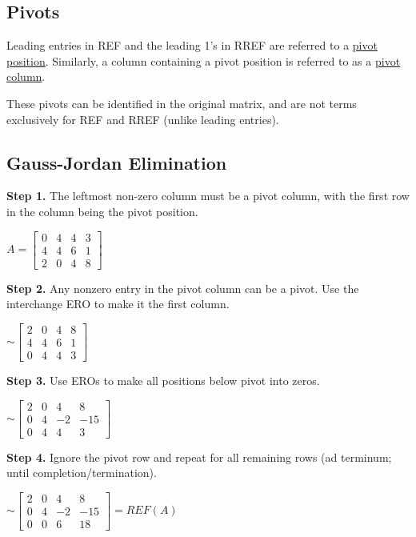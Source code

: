 \documentclass{report}
\begin{document}
\subsection*{Pivots}
\begin{definition}
	Leading entries in REF and the leading 1's in RREF are referred to a \underline{pivot position}. Similarly, a column containing a pivot position is referred to as a \underline{pivot column}.
\end{definition}
These pivots can be identified in the original matrix, and are not terms exclusively for REF and RREF (unlike leading entries).

\subsection*{Gauss-Jordan Elimination}

\begin{fullindent}{1cm}
	\textbf{Step 1.} The leftmost non-zero column must be a pivot column, with the first row in the column being the pivot position.
	\begin{center}
		$A = \begin{bmatrix}
			0 & 4 & 4 & 3 \\
			4 & 4 & 6 & 1 \\
			2 & 0 & 4 & 8
		\end{bmatrix}$
	\end{center}	
	\textbf{Step 2.} Any nonzero entry in the pivot column can be a pivot. Use the interchange ERO to make it the first column.
	\begin{center}
		$\sim \begin{bmatrix}
			2 & 0 & 4 & 8 \\
			4 & 4 & 6 & 1 \\
			0 & 4 & 4 & 3
		\end{bmatrix}$
	\end{center}
	\textbf{Step 3.} Use EROs to make all positions below pivot into zeros.
	\begin{center}
		$\sim \begin{bmatrix}
			2 & 0 & 4 & 8 \\
			0 & 4 & -2 & -15 \\
			0 & 4 & 4 & 3
		\end{bmatrix}$
	\end{center}
	\textbf{Step 4.} Ignore the pivot row and repeat for all remaining rows (ad terminum; until completion/termination).
	\begin{center}
		$\sim \begin{bmatrix}
			2 & 0 & 4 & 8 \\
			0 & 4 & -2 & -15 \\
			0 & 0 & 6 & 18
		\end{bmatrix} = REF(A)$
	\end{center}
\end{fullindent}
\end{document}

